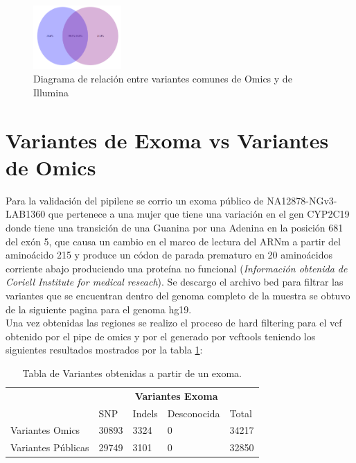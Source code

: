 \begin{figure}[H]
	\centering
	\includegraphics[width=0.3\textwidth]{Kap2/diagrama1}
	\caption{Diagrama de relación entre variantes comunes de Omics y de Illumina} \label{fig:diagrama}
\end{figure}

\section{Variantes de Exoma vs Variantes de Omics}

Para la validación del pipilene se corrio un exoma público de  NA12878-NGv3-LAB1360 que pertenece a una mujer que tiene una variación en el gen CYP2C19 donde tiene una transición de una Guanina por una Adenina en la posición 681 del exón 5, que causa un cambio en el marco de lectura del ARNm a partir del aminoácido 215 y produce un códon de parada prematuro en 20 aminoácidos corriente abajo produciendo una proteína no funcional (\textit{Información obtenida de Coriell Institute for medical reseach}). Se descargo el archivo bed para filtrar las variantes que se encuentran dentro del genoma completo de la muestra se obtuvo de la siguiente pagina para el genoma hg19.\\

Una vez obtenidas las regiones se realizo el proceso de hard filtering para el vcf obtenido por el pipe de omics y por el generado por vcftools teniendo los siguientes resultados mostrados por la tabla \ref{tabla:tabla2}: \\

\begin{table}[H]
	\centering  
	\begin{tabular}{|l|l|l|l|l|}
		\hline
		& \multicolumn{4}{c|}{\textbf{Variantes Exoma}} \\
		\cline{2-5} 
		& SNP  & Indels & Desconocida & Total \\ \cline{2-5}
		\hline 
		\multirow{1}{4cm}{Variantes Omics} & 30893 & 3324 & 0 & 34217 \\ \cline{2-5}
		\hline 
		\multirow{1}{4cm}{Variantes Públicas} & 29749 & 3101 & 0 & 32850 \\ \cline{2-5}
		\hline
	\end{tabular}
	\caption{Tabla de Variantes obtenidas a partir de un exoma.}
	\label{tabla:tabla2}
\end{table} 

